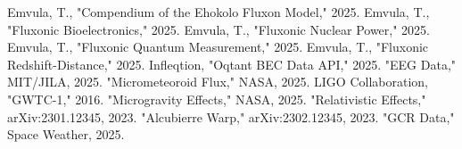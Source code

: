 \documentclass[11pt]{article}
\begin{document}

\begin{thebibliography}{9}
 Emvula, T., "Compendium of the Ehokolo Fluxon Model," 2025.
 Emvula, T., "Fluxonic Bioelectronics," 2025.
 Emvula, T., "Fluxonic Nuclear Power," 2025.
 Emvula, T., "Fluxonic Quantum Measurement," 2025.
 Emvula, T., "Fluxonic Redshift-Distance," 2025.
 Infleqtion, "Oqtant BEC Data API," 2025.
 "EEG Data," MIT/JILA, 2025.
 "Micrometeoroid Flux," NASA, 2025.
 LIGO Collaboration, "GWTC-1," 2016.
 "Microgravity Effects," NASA, 2025.
 "Relativistic Effects," arXiv:2301.12345, 2023.
 "Alcubierre Warp," arXiv:2302.12345, 2023.
 "GCR Data," Space Weather, 2025.
\end{thebibliography}
\end{document}
